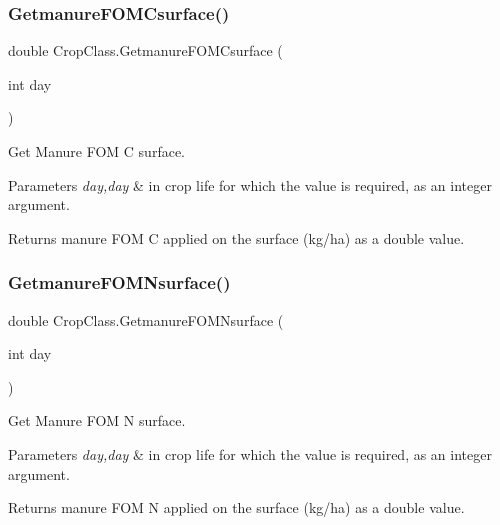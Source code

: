 \subsubsection{\texorpdfstring{GetmanureFOMCsurface()}{GetmanureFOMCsurface()}}
{\footnotesize\ttfamily double Crop\+Class.\+Getmanure\+F\+O\+M\+Csurface (\begin{DoxyParamCaption}\item[{int}]{day }\end{DoxyParamCaption})\hspace{0.3cm}{\ttfamily [inline]}}



Get Manure F\+OM C surface. 


\begin{DoxyParams}{Parameters}
{\em day,day} & in crop life for which the value is required, as an integer argument. \\
\hline
\end{DoxyParams}
\begin{DoxyReturn}{Returns}
manure F\+OM C applied on the surface (kg/ha) as a double value. 
\end{DoxyReturn}
\mbox{\label{class_crop_class_ae26a1b93ce62ef13eaa40c463fa24c92}} 
\subsubsection{\texorpdfstring{GetmanureFOMNsurface()}{GetmanureFOMNsurface()}}
{\footnotesize\ttfamily double Crop\+Class.\+Getmanure\+F\+O\+M\+Nsurface (\begin{DoxyParamCaption}\item[{int}]{day }\end{DoxyParamCaption})\hspace{0.3cm}{\ttfamily [inline]}}



Get Manure F\+OM N surface. 


\begin{DoxyParams}{Parameters}
{\em day,day} & in crop life for which the value is required, as an integer argument. \\
\hline
\end{DoxyParams}
\begin{DoxyReturn}{Returns}
manure F\+OM N applied on the surface (kg/ha) as a double value. 
\end{DoxyReturn}
\mbox{\label{class_crop_class_ad7e6adfa5dfd99f0f748eedab3b3e336}} 
